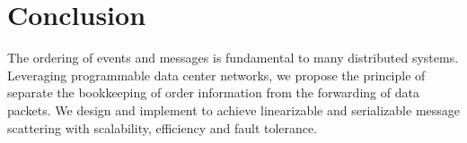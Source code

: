 \section{Conclusion}
\label{sec:conclusion}

The ordering of events and messages is fundamental to many distributed systems.
Leveraging programmable data center networks, we propose the principle of separate the bookkeeping of order information from the forwarding of data packets.
We design and implement \sys to achieve linearizable and serializable message scattering with scalability, efficiency and fault tolerance.
